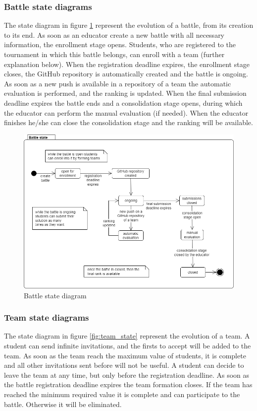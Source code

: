 \subsubsection*{Battle state diagrams}
The state diagram in figure \ref{fig:battle_state} represent the evolution of a battle, from its creation to its end. \newline
As soon as an educator create a new battle with all necessary information, the enrollment stage opens. Students, who are registered to the tournament in which this battle belongs, can enroll with a team (further explanation below). \newline
When the registration deadline expires, the enrollment stage closes, the GitHub repository is automatically created and the battle is ongoing. As soon as a new push is available in a repository of a team the automatic evaluation is performed, and the ranking is updated. \newline
When the final submission deadline expires the battle ends and a consolidation stage opens, during which the educator can perform the manual evaluation (if needed). When the educator finishes he/she can close the consolidation stage and the ranking will be available.
\begin{figure}[H]
    \centering
    \includegraphics[scale=0.5]{images/battle_state.png}
    \caption{Battle state diagram}
    \label{fig:battle_state}
\end{figure}

\subsubsection*{Team state diagrams}
The state diagram in figure \ref{fig:team_state} represent the evolution of a team. \newline
A student can send infinite invitations, and the firsts to accept will be added to the team. As soon as the team reach the maximum value of students, it is complete and all other invitations sent before will not be useful.  A student can decide to leave the team at any time, but only before the registration deadline. \newline
As soon as the battle registration deadline expires the team formation closes. If the team has reached the minimum required value it is complete and can participate to the battle. Otherwise it will be eliminated. 

